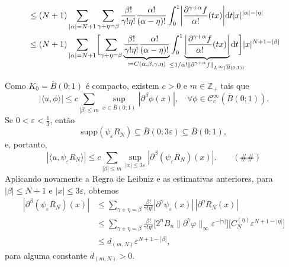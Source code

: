 \documentclass[../distribution_theory_notes.tex]{subfiles}
\begin{document}
\begin{proof*}
\begin{align*}
		 & \leq (N+1)\sum\limits_{| \alpha  | = N+1}^{}\sum\limits_{\gamma +\eta =\beta }^{}\frac{\beta !}{\gamma !\eta !}\frac{\alpha !}{(\alpha -\eta )!}\int_{0}^{1}\biggl\vert \frac{\partial^{\gamma +\alpha }f}{\alpha !}(tx) \biggr\vert \mathrm{d}t | x |^{| \alpha  |-| \eta  |}                                                                                                                                                                                               \\
		 & \leq (N+1)\sum\limits_{| \alpha  |=N+1}^{}\biggl[\sum\limits_{\gamma +\eta =\beta }^{}\underbrace{\frac{\beta !}{\gamma !\eta !}\frac{\alpha !}{(\alpha -\eta )!}}_{\mathclap{\coloneqq C(\alpha , \beta , \gamma , \eta )}}\int_{0}^{1}\underbrace{\biggl\vert \frac{\partial^{\gamma +\alpha }f}{\alpha !}(tx) \biggr\vert}_{\mathclap{\leq 1/\alpha ! \Vert \partial^{\gamma +\alpha }f \Vert_{L^{\infty}(\overline{B}(0; 1))}}} \mathrm{d}t\biggr]| x |^{N+1-| \beta  |}
	\end{align*}

	Como \(K_{0}=\overline{B}(0;1)\) é compacto, existem \(c>0\) e \(m\in \mathbb{Z}_{+}\) tais que
	\[
		|\langle u, \phi \rangle |
		\leq c\sum\limits_{|\beta |\leq m}^{}\sup_{x\in \overline{B}(0;1)}|\partial^{\beta }\phi (x)|,
		\quad \forall \phi \in \mathcal{C}_{c}^{\infty}(\overline{B}(0;1)).
	\]
	Se \(0<\varepsilon <\frac{1}{3}\), então
	\[
		\mathrm{supp}(\psi_{\varepsilon }R_{N})\subseteq \overline{B}(0;3\varepsilon )\subseteq \overline{B}(0;1),
	\]
	e, portanto,
	\[
		|\langle u, \psi_{\varepsilon }R_{N}\rangle |
		\leq c\sum\limits_{|\beta |\leq m}^{}\sup_{|x|\leq 3\varepsilon }|\partial^{\beta }(\psi_{\varepsilon }R_{N})(x)|. \qquad (\#\#)
	\]
	Aplicando novamente a Regra de Leibniz e as estimativas anteriores, para \(|\beta |\leq N+1\) e \(|x|\leq 3\varepsilon \), obtemos
	\begin{align*}
		|\partial^{\beta }(\psi_{\varepsilon }R_{N})(x)|
		 & \leq \sum\limits_{\gamma +\eta =\beta }^{}\frac{\beta !}{\gamma !\eta !}
		|\partial^{\gamma }\psi_{\varepsilon }(x)|\,|\partial^{\eta }R_{N}(x)|      \\
		 & \leq \sum\limits_{\gamma +\eta =\beta }^{}\frac{\beta !}{\gamma !\eta !}
		\bigl[2^{n}B_{n}\|\partial^{\gamma }\varphi \|_{\infty }\varepsilon^{-|\gamma |}\bigr]
		\bigl[C_{N}^{(\eta )}\varepsilon^{N+1-|\eta |}\bigr]                        \\
		 & \leq d_{(m,N)}\varepsilon^{N+1-|\beta |},
	\end{align*}
	para alguma constante \(d_{(m,N)}>0\).


\end{proof*}
\end{document}
